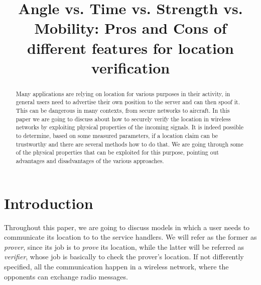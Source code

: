 \documentclass[conference]{IEEEtran}
\begin{document}
\title{Angle vs. Time vs. Strength vs. Mobility: Pros and Cons of different features for location verification}


\maketitle

\begin{abstract}
    Many applications are relying on location for various purposes in their activity, in general users need to advertise their own position to the server and can then spoof it. This can be dangerous in many contexts, from secure networks to aircraft. In this paper we are going to discuss about how to securely verify the location in wireless networks by exploiting physical properties of the incoming signals. It is indeed possible to determine, based on some measured parameters, if a location claim can be trustworthy and there are several methods how to do that. We are going through some of the physical properties that can be exploited for this purpose, pointing out advantages and disadvantages of the various approaches.
\end{abstract}

\section{Introduction}
Throughout this paper, we are going to discuss models in which a user needs to communicate its location to to the service handlers. We will refer as the former as \emph{prover}, since its job is to \emph{prove} its location, while the latter will be referred as \emph{verifier}, whose job is basically to check the prover's location. If not differently specified, all the communication happen in a wireless network, where the opponents can exchange radio messages.
\end{document}
